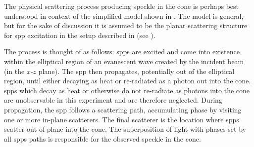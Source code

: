 The physical scattering process producing speckle in the cone is perhaps best
understood in context of the simplified model shown in
.  The model is general, but for the sake of
discussion it is assumed to be the planar scattering structure for \gls{spp}
excitation in the setup described in  (see
).

The process is thought of as follows: \glspl{spp} are excited and come into existence
within the elliptical region of an evanescent wave created by the incident
beam (in the $x$-$z$ plane).  The \gls{spp} then propagates, potentially out of the
elliptical region, until either decaying as heat or re-radiated as a photon
out into the cone.
\glspl{spp} which decay as heat or otherwise do not
re-radiate as photons into the cone are unobservable in this experiment and
are therefore neglected.  During propagation, the \gls{spp} follows a scattering
path, accumulating phase by visiting one or more in-plane scatterers.  The
final scatterer is the location where \glspl{spp} scatter out of plane into the cone.
The superposition of light with phases set by all \glspl{spp} paths is responsible
for the observed speckle in the cone.

